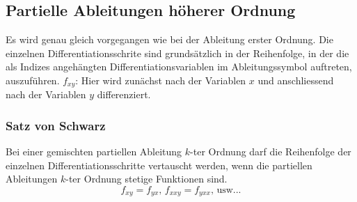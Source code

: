 \subsection{Partielle Ableitungen höherer Ordnung}
\begin{definition}
Es wird genau gleich vorgegangen wie bei der Ableitung erster Ordnung. Die einzelnen Differentiationsschrite sind grundsätzlich in der Reihenfolge, in der die als Indizes angehängten Differentiationsvariablen im Ableitungssymbol auftreten, auszuführen. $f_{xy}$: Hier wird zunächst nach der Variablen $x$ und anschliessend nach der Variablen $y$ differenziert.
\end{definition}
\subsubsection{Satz von Schwarz}
\begin{definition}
Bei einer gemischten partiellen Ableitung $k$-ter Ordnung darf die Reihenfolge der einzelnen Differentiationsschritte vertauscht werden, wenn die partiellen Ableitungen $k$-ter Ordnung stetige Funktionen sind.
$$ f_{xy} = f_{yx} \text{, }  f_{xxy} = f_{yxx} \text{, usw...}$$
\end{definition}